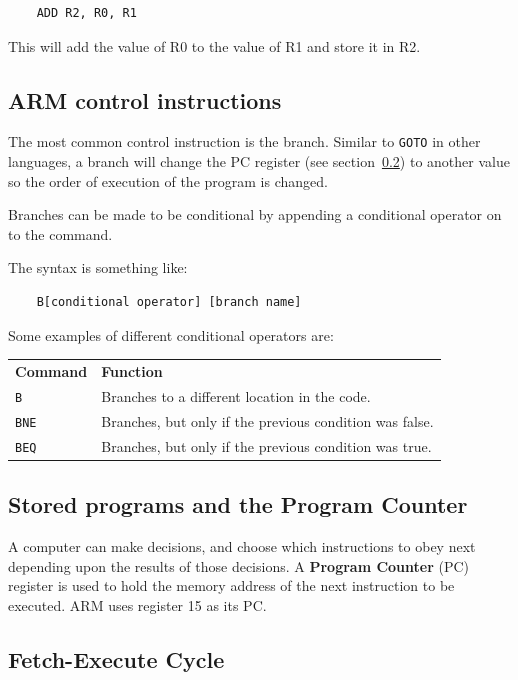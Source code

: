 \begin{verbatim}
	ADD	R2, R0, R1
\end{verbatim}

This will add the value of R0 to the value of R1 and store it in R2.

\subsection{ARM control instructions}

The most common control instruction is the branch. Similar to \texttt{GOTO} in
other languages, a branch will change the PC register (see
section~\ref{subsec:pc}) to another value so the order of execution of the
program is changed.

Branches can be made to be conditional by appending a conditional operator on to
the command.

The syntax is something like:

\begin{verbatim}
	B[conditional operator]	[branch name]
\end{verbatim}

Some examples of different conditional operators are:

\begin{tabularx}{\textwidth}{l X}
	{\bf Command} & {\bf Function}\\
	\texttt{B} & Branches to a different location in the code.\\
	\texttt{BNE} & Branches, but only if the previous condition was false.\\
	\texttt{BEQ} & Branches, but only if the previous condition was true.\\
\end{tabularx}

\subsection{Stored programs and the Program Counter}
\label{subsec:pc}

A computer can make decisions, and choose which instructions to obey next
depending upon the results of those decisions. A {\bf Program Counter} (PC)
register is used to hold the memory address of the next instruction to be
executed. ARM uses register 15 as its PC.

\subsection{Fetch-Execute Cycle}

